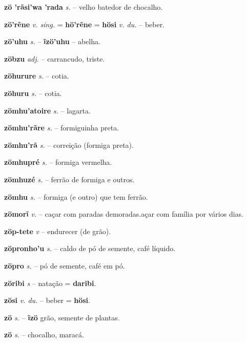 \textbf{zö 'rãsi'wa 'rada} \textit{s.} -- velho batedor de chocalho.

\textbf{zö'rẽne} \textit{v. sing.} = \textbf{hö'rẽne} = \textbf{hösi} \textit{v. du.} -- beber.

\textbf{zö'uhu} \textit{ s.} -- \textbf{ĩzö'uhu} -- abelha.

\textbf{zöbzu} \textit{adj.} -- carrancudo, triste.

\textbf{zöhurure} \textit{s.} -- cotia.

\textbf{zöhuru} \textit{s.} -- cotia.

\textbf{zömhu'atoire} \textit{s.} -- lagarta.

\textbf{zömhu'rãre} \textit{s.} -- formiguinha preta.

\textbf{zömhu'rã} \textit{s.} -- correição (formiga preta).

\textbf{zömhupré} \textit{s.} -- formiga vermelha.

\textbf{zömhuzé} \textit{s.} -- ferrão de formiga e outros.

\textbf{zömhu} \textit{s.} -- formiga (e outro) que tem ferrão.

\textbf{zömorĩ} \textit{v.} -- caçar com paradas demoradas.açar com família por vários dias.

\textbf{zöp-tete} \textit{v} -- {endurecer (de grão)}.

\textbf{zöpronho'u} \textit{s.} -- caldo de pó de semente, café líquido.

\textbf{zöpro} \textit{s.} -- pó de semente, café em pó.

\textbf{zöribi} \textit{s} -- natação = \textbf{daribi}.

\textbf{zösi} \textit{v. du.} -- beber = \textbf{hösi}.

\textbf{zö} \textit{s.} -- \textbf{ĩzö} grão, semente de plantas.

\textbf{zö} \textit{s.} -- chocalho, maracá.


